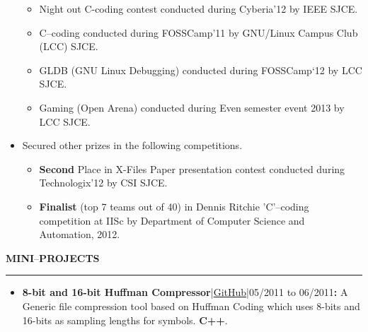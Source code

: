 \documentclass[a4paper, 10pt]{extarticle}
\begin{document}
\begin{large}
\begin{itemize}
{\begin{itemize}
            \item{Night out C-coding contest conducted during Cyberia'12 by IEEE
SJCE.}
            
            \item{C--coding conducted during FOSSCamp'11 by GNU/Linux Campus
Club (LCC) SJCE.}
            
            \item{GLDB (GNU Linux Debugging) conducted during FOSSCamp`12 by LCC
SJCE.}
            
            \item{Gaming (Open Arena) conducted during Even semester event 2013
by LCC SJCE.}
        \end{itemize}
    }
    \vspace{-.1cm}
    
    \item{Secured other prizes in the following competitions.
        \begin{itemize}
        \vspace{-.2cm}
            \item{\textbf{Second} Place in X-Files Paper presentation contest
conducted during Technologix'12 by CSI SJCE.}
            
            \item{\textbf{Finalist} (top 7 teams out of 40) in Dennis Ritchie
'C'--coding competition at IISc by Department of Computer Science and
Automation, 2012.}
        \end{itemize}
    }
    \vspace{-.1cm}
    
\end{itemize}


\begin{flushleft}
{\LARGE{\textbf{M}}\Large{\textbf{INI}}\large{--}\LARGE{\textbf{P}}\Large{\textbf{ROJECTS}}}
\end{flushleft}
\vspace{-.2cm} \hrule \vspace{-.1cm}

\begin{itemize}

    \item{\textbf{8-bit and 16-bit Huffman
Compressor}|\href{https://github.com/pradeep0605/HuffmanCompressor}{GitHub}|05/2011
to 06/2011\textbf{{\Large{:}}} A Generic file compression tool based on Huffman
Coding which uses 8-bits and 16-bits as sampling lengths for symbols.
\textbf{C++}.} 
    \vspace{-.1cm}
    

\end{itemize}
\end{large}
\end{document}

